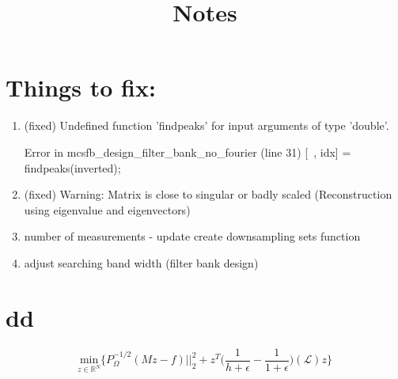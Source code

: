 \documentclass[a4paper]{article}
\title{Notes}
\newcommand{\RR}{\mathbb{R}}
\renewcommand{\L}{\boldsymbol{\mathcal{L}}}
\theoremstyle{definition}
\begin{document}
\maketitle

\newpage


\section{Things to fix:}
\begin{enumerate}
\item (fixed) Undefined function 'findpeaks' for input
arguments of type 'double'.

Error in mcsfb\_design\_filter\_bank\_no\_fourier
(line 31)
    [~, idx] = findpeaks(inverted); 
    
\item (fixed) Warning: Matrix is close to singular or badly scaled (Reconstruction using eigenvalue and eigenvectors)


\item number of measurements - update create downsampling sets function

\item adjust searching band width (filter bank design)

\end{enumerate}

\section{dd}

$$\underset{z \in \RR^N}{\text{min}} \{ P^{-1/2}_\Omega (Mz-f)\vert\vert_2^2 + z^T \bigg( \frac{1}{h+\epsilon}-\frac{1}{1+\epsilon} \bigg) (\L)z\}$$
\end{document}

